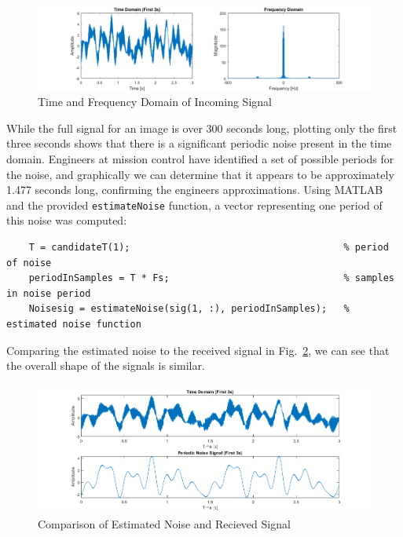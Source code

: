 \documentclass[12pt]{article}
\numberwithin{equation}{section}
\numberwithin{figure}{section}
\numberwithin{table}{section}
\begin{document}
\begin{figure}[h]
    \centering
    \includegraphics{figures/p2-timefreq.png}
    \caption{Time and Frequency Domain of Incoming Signal\label{fig:p2-timefreq}}
\end{figure}

While the full signal for an image is over 300 seconds long, plotting only the
first three seconds shows that there is a significant periodic noise present in
the time domain. Engineers at mission control have identified a set of possible
periods for the noise, and graphically we can determine that it appears to be
approximately 1.477 seconds long, confirming the engineers approximations.
Using MATLAB and the provided \verb+estimateNoise+ function, a vector
representing one period of this noise was computed:
\begin{verbatim}
    T = candidateT(1);                                      % period of noise
    periodInSamples = T * Fs;                               % samples in noise period
    Noisesig = estimateNoise(sig(1, :), periodInSamples);   % estimated noise function
\end{verbatim}

Comparing the estimated noise to the received signal in
Fig.~\ref{fig:p2-noisecomp}, we can see that the overall shape of the signals
is similar.

\begin{figure}[ht]
    \centering
    \includegraphics{figures/p2-noisecomp.png}
    \caption{Comparison of Estimated Noise and Recieved Signal\label{fig:p2-noisecomp}}
\end{figure}
\end{document}
